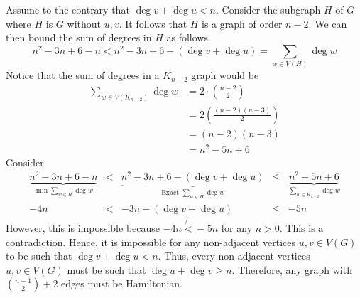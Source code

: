 \documentclass{article}
\begin{document}
\begin{enumerate}
{      Assume to the contrary that \(\deg v + \deg u < n\). Consider the 
      subgraph \(H\) of \(G\) where \(H\) is \(G\) without \(u, v\).
      It follows that \(H\) is a graph of order \(n-2\). We
      can then bound the sum of degrees in \(H\) as follows. 
      \[
        n^2 - 3n + 6 - n < n^2 - 3n + 6 - (\deg v + \deg u) = \sum_{w \in V(H)}
        \deg w
      \]
      Notice that the sum of degrees in a \(K_{n-2}\) graph would be 
      \[
        \begin{aligned}
          \sum_{w \in V(K_{n-2})} \deg w
            &= 2 \cdot \binom{n-2}{2} \\ 
            &= 2 \left(\frac{(n-2)(n-3)}{2}\right) \\ 
            &= (n-2)(n-3) \\ 
            &= n^2 - 5n + 6
        \end{aligned}
      \]
      Consider
      \[
        \begin{aligned}
          \underbrace{n^2 - 3n + 6 - n}_{\min \sum_{w \in H} \deg w}
            &<& \underbrace{n^2 - 3n + 6 - (\deg v + \deg u)}_\text{Exact
            \(\sum_{w \in H} \deg w\)}
            &\leq& \underbrace{n^2 - 5n + 6}_{\sum_{w \in K_{n-2}} \deg w} \\ 
          -4n &<& -3n - (\deg v + \deg u) &\leq& - 5n
        \end{aligned}
      \]
      However, this is impossible because \(-4n \not{<} -5n\) for any \(n > 0\).
      This is a contradiction. Hence, it is impossible for any non-adjacent
      vertices \(u, v \in V(G)\) to be such that \(\deg v + \deg u < n\).
      Thus, every non-adjacent vertices \(u, v \in V(G)\) must be such that
      \(\deg u + \deg v \geq n\). Therefore, any graph with \(\binom{n-1}{2} +
      2\) edges must be Hamiltonian.
    }
\end{enumerate}

% 
% 
\end{document}
